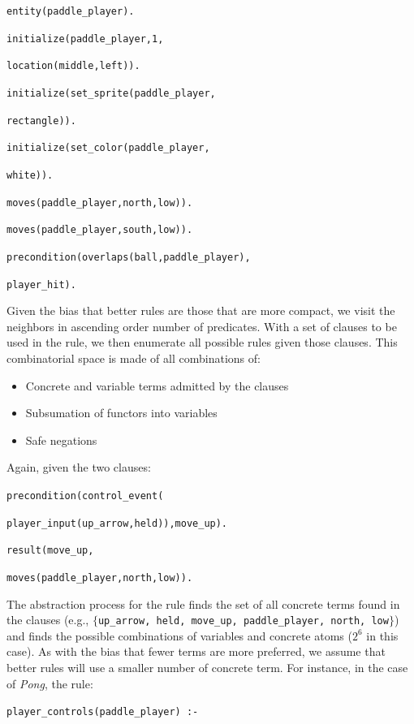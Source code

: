 \documentclass[12pt]{report}
\begin{document}
\noindent \texttt{entity(paddle\_player).}

\noindent \texttt{initialize(paddle\_player,1,}

\texttt{location(middle,left)).}

\noindent \texttt{initialize(set\_sprite(paddle\_player,}

\texttt{rectangle)).}

\noindent \texttt{initialize(set\_color(paddle\_player,}

\texttt{white)).}

\noindent \texttt{moves(paddle\_player,north,low)).}

\noindent \texttt{moves(paddle\_player,south,low)).}

\noindent \texttt{precondition(overlaps(ball,paddle\_player),}

\texttt{player\_hit).}

Given the bias that better rules are those that are more compact, we visit the neighbors in ascending order number of predicates. With a set of clauses to be used in the rule, we then enumerate all possible rules given those clauses. This combinatorial space is made of all combinations of:

\begin{itemize}
\item Concrete and variable terms admitted by the clauses
\item Subsumation of functors into variables
\item Safe negations
\end{itemize}

Again, given the two clauses:


\noindent \texttt{precondition(control\_event(}

\texttt{player\_input(up\_arrow,held)),move\_up).}

\noindent \texttt{result(move\_up,}

\texttt{moves(paddle\_player,north,low)).}

The abstraction process for the rule finds the set of all concrete terms found in the clauses (e.g., $\{$\texttt{up\_arrow, held, move\_up, paddle\_player, north, low}$\}$) and finds the possible  combinations of variables and concrete atoms ($2^6$ in this case). As with the bias that fewer terms are more preferred, we assume that better rules will use a smaller number of concrete term. For instance, in the case of \textit{Pong}, the rule:

\noindent \texttt{player\_controls(paddle\_player) :- }
\end{document}
